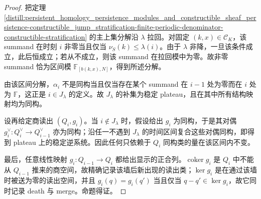 \begin{proof}
把定理 \ref{distill:persistent_homology_persistence_modules_and_constructible_sheaf_persistence-constructible_jump_stratification-finite-periodic-denominator-constructible-stratification} 的主上集分解沿 \(\lambda\) 拉回。对固定 \((k,x)\in\mathcal C_K\)，该 summand 在时刻 \(i\) 非零当且仅当 \(\nu_S(k)\le\lambda(i)\)。由于 \(\lambda\) 非降，一旦该条件成立，此后恒成立；若从不成立，则该 summand 在拉回模中为零。故非零 summand 恰为区间模 \(\mathbb F_{[b(k,x),N]}\)，得到所述分解。

由该区间分解，\(\alpha_i\) 不是同构当且仅当存在某个 summand 在 \(i-1\) 处为零而在 \(i\) 处为 \(\mathbb F\)，这正是 \(i\in J_\lambda\) 的定义。故 \(J_\lambda\) 的补集为稳定 plateau，且在其中所有结构映射均为同构。

设再给定商读出 \((Q_i,g_i)\)。当 \(i\notin J_\lambda\) 时，假设给出 \(g_i\) 为同构，于是其对偶 \(g_i^\vee:Q_i^\vee\to Q_{i-1}^\vee\) 亦为同构；沿任一不遇到 \(J_\lambda\) 的时间区间复合这些对偶同构，即得到 plateau 上的稳定逆系统。因此任何只依赖于 \(Q_i\) 同构类的量在该区间内不变。

最后，任意线性映射 \(g_i:Q_{i-1}\to Q_i\) 都给出显示的正合列。\(\operatorname{coker}g_i\) 是 \(Q_i\) 中不能从 \(Q_{i-1}\) 推来的商空间，故精确记录该墙后新出现的读出类；\(\ker g_i\) 是在通过该墙时被送为零的读出空间，并且 \(g_i(q)=g_i(q')\) 当且仅当 \(q-q'\in\ker g_i\)，故它同时记录 death 与 merge。命题得证。
\end{proof}

\endinput

